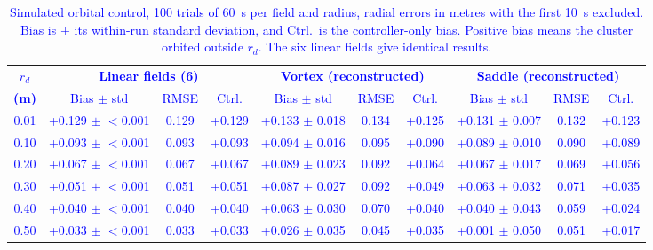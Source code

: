 \documentclass[lettersize,journal]{IEEEtran}
\newcommand{\rev}[1]{\textcolor{blue}{#1}}           %
\begin{document}
\begin{table}[!t]
\centering
\footnotesize
\caption{Simulated orbital control, 100 trials of 60~s per field and radius, radial errors in metres with the first 10~s excluded. Bias is $\pm$ its within-run standard deviation, and Ctrl.\ is the controller-only bias. Positive bias means the cluster orbited outside $r_d$. The six linear fields give identical results.}
\label{tab:simulation_orbital_results}
\setlength{\tabcolsep}{3pt}
\rev{\begin{tabular}{c|ccc|ccc|ccc}
\hline
\textbf{$r_d$} & \multicolumn{3}{c|}{\textbf{Linear fields (6)}} & \multicolumn{3}{c|}{\textbf{Vortex (reconstructed)}} & \multicolumn{3}{c}{\textbf{Saddle (reconstructed)}} \\
\textbf{(m)} & Bias $\pm$ std & RMSE & Ctrl. & Bias $\pm$ std & RMSE & Ctrl. & Bias $\pm$ std & RMSE & Ctrl. \\
\hline
0.01 & +0.129 $\pm$ $<$0.001 & 0.129 & +0.129 & +0.133 $\pm$ 0.018 & 0.134 & +0.125 & +0.131 $\pm$ 0.007 & 0.132 & +0.123 \\
0.10 & +0.093 $\pm$ $<$0.001 & 0.093 & +0.093 & +0.094 $\pm$ 0.016 & 0.095 & +0.090 & +0.089 $\pm$ 0.010 & 0.090 & +0.089 \\
0.20 & +0.067 $\pm$ $<$0.001 & 0.067 & +0.067 & +0.089 $\pm$ 0.023 & 0.092 & +0.064 & +0.067 $\pm$ 0.017 & 0.069 & +0.056 \\
0.30 & +0.051 $\pm$ $<$0.001 & 0.051 & +0.051 & +0.087 $\pm$ 0.027 & 0.092 & +0.049 & +0.063 $\pm$ 0.032 & 0.071 & +0.035 \\
0.40 & +0.040 $\pm$ $<$0.001 & 0.040 & +0.040 & +0.063 $\pm$ 0.030 & 0.070 & +0.040 & +0.040 $\pm$ 0.043 & 0.059 & +0.024 \\
0.50 & +0.033 $\pm$ $<$0.001 & 0.033 & +0.033 & +0.026 $\pm$ 0.035 & 0.045 & +0.035 & +0.001 $\pm$ 0.050 & 0.051 & +0.017 \\
\hline
\end{tabular}} %
\end{table}
\end{document}
